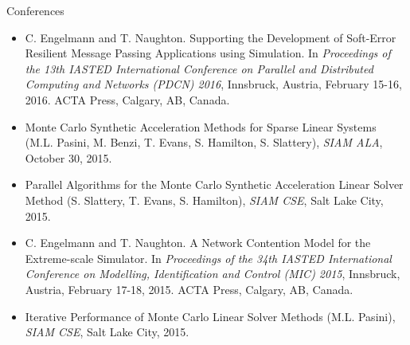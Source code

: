 \documentclass{beamer}
\begin{document}

\begin{frame}{Conferences}

  \begin{itemize}
    \footnotesize
    \setlength{\itemsep}{-0.1\baselineskip}
  \item C. Engelmann and T. Naughton. Supporting the Development of Soft-Error
    Resilient Message Passing Applications using Simulation. In
    \textit{Proceedings of the 13th IASTED International Conference on
      Parallel and Distributed Computing and Networks (PDCN) 2016}, Innsbruck,
    Austria, February 15-16, 2016. ACTA Press, Calgary, AB, Canada.
  \item Monte Carlo Synthetic Acceleration Methods for Sparse Linear Systems
    (M.L. Pasini, M. Benzi, T. Evans, S. Hamilton, S. Slattery), \textit{SIAM
      ALA}, October 30, 2015.
  \item Parallel Algorithms for the Monte Carlo Synthetic Acceleration Linear
    Solver Method (S. Slattery, T. Evans, S. Hamilton), \textit{SIAM CSE},
    Salt Lake City, 2015.
  \item C. Engelmann and T. Naughton. A Network Contention Model for the
    Extreme-scale Simulator. In \textit{Proceedings of the 34th IASTED
      International Conference on Modelling, Identification and Control (MIC)
      2015}, Innsbruck, Austria, February 17-18, 2015. ACTA Press, Calgary,
    AB, Canada.
  \item Iterative Performance of Monte Carlo Linear Solver Methods
    (M.L. Pasini), \textit{SIAM CSE}, Salt Lake City, 2015.
  \end{itemize}

\end{frame}

\end{document}
